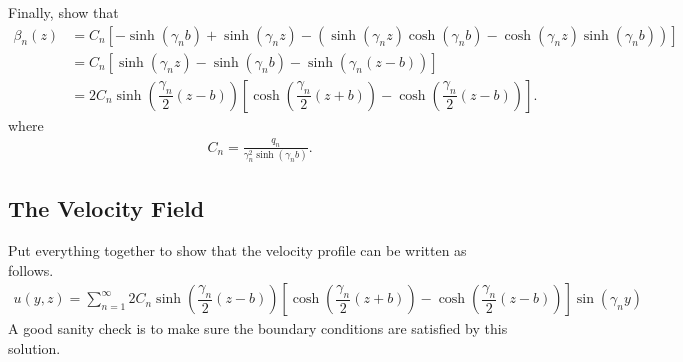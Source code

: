 \documentclass[11pt]{article}
\begin{document}
    Finally, show that 
    \begin{align}
      \beta_{n}\left(z\right) &= C_{n} 
        \left[-\sinh\left(\gamma_{n}b\right) + \sinh\left(\gamma_{n}z\right) - 
          \left(\sinh\left(\gamma_{n}z\right)\cosh\left(\gamma_{n}b\right) - 
            \cosh\left(\gamma_{n}z\right)\sinh\left(\gamma_{n}b\right)\right)\right] \\
      &=  C_{n}
           \left[\sinh\left(\gamma_{n}z\right) - \sinh\left(\gamma_{n}b\right) - 
            \sinh\left(\gamma_{n}\left(z-b\right)\right)\right] \label{eq:beta-cn}\\
      &= 2C_{n}\sinh\left(\dfrac{\gamma_{n}}{2}\left(z-b\right)\right) 
           \left[\cosh\left(\dfrac{\gamma_{n}}{2}\left(z+b\right)\right) - 
             \cosh\left(\dfrac{\gamma_{n}}{2}\left(z-b\right)\right)\right].
    \end{align}
    where 
    \begin{align}
      C_{n} = \frac{q_{n}}{\gamma_{n}^{2}\sinh\left(\gamma_{n}b\right)}. 
    \end{align}
    
    \begin{solution}
        
    \end{solution}

    \subsection{The Velocity Field}
    Put everything together to show that the velocity profile can be written as follows.
    \begin{align}
      u\left(y,z\right) = \sum_{n=1}^{\infty}{2C_{n} 
        \sinh\left(\dfrac{\gamma_{n}}{2}\left(z-b\right)\right)\left[\cosh\left(\dfrac{\gamma_{n}}{2}\left(z+b\right)\right) - 
          \cosh\left(\dfrac{\gamma_{n}}{2}\left(z-b\right)\right)\right]\sin\left(\gamma_{n}y\right)}
    \end{align}
    A good sanity check is to make sure the boundary conditions are satisfied by this solution.
\end{document}
